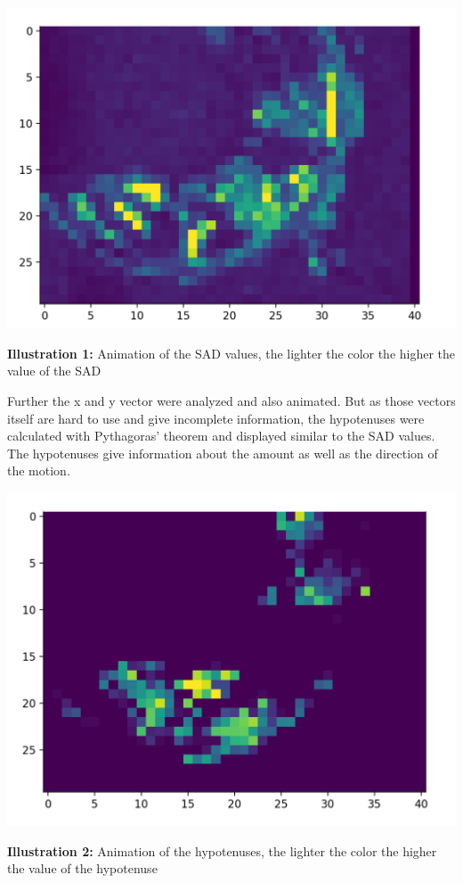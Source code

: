 \documentclass[12pt, a4paper]{report}
\begin{document}
\bigskip

\noindent
\begin{center}
\includegraphics[scale=0.6]{Images/animation_sad.png}

{\bf Illustration 1:}  Animation of the SAD values, the lighter the color the higher the value of the SAD
\end{center}

\bigskip
 
Further the x and y vector were analyzed and also animated. But as those vectors itself are hard to use and give incomplete information, the hypotenuses were calculated with Pythagoras' theorem and displayed similar to the SAD values. The hypotenuses give information about the amount as well as the direction of the motion.
 
 \bigskip

\noindent
\begin{center}
\includegraphics[scale=0.6]{Images/animation_hypotenuse.png}

{\bf Illustration 2:}  Animation of the hypotenuses, the lighter the color the higher the value of the hypotenuse
\end{center}
\end{document}

